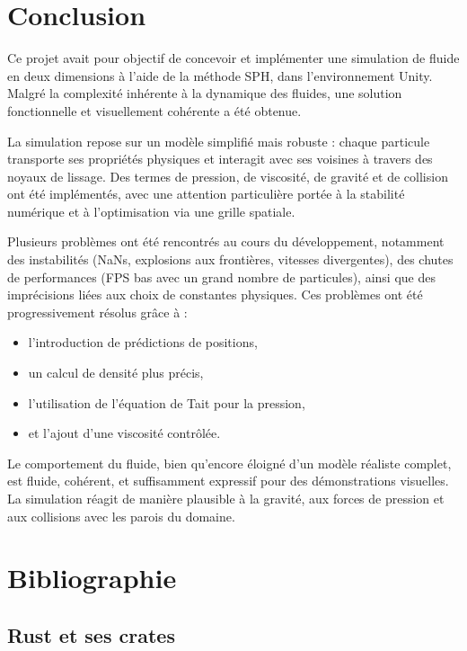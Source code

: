\documentclass{article}
\begin{document}
\section{Conclusion}

Ce projet avait pour objectif de concevoir et implémenter une simulation de fluide en deux dimensions à l’aide de la méthode SPH, dans l’environnement Unity. Malgré la complexité inhérente à la dynamique des fluides, une solution fonctionnelle et visuellement cohérente a été obtenue.

La simulation repose sur un modèle simplifié mais robuste : chaque particule transporte ses propriétés physiques et interagit avec ses voisines à travers des noyaux de lissage. Des termes de pression, de viscosité, de gravité et de collision ont été implémentés, avec une attention particulière portée à la stabilité numérique et à l’optimisation via une grille spatiale.

Plusieurs problèmes ont été rencontrés au cours du développement, notamment des instabilités (NaNs, explosions aux frontières, vitesses divergentes), des chutes de performances (FPS bas avec un grand nombre de particules), ainsi que des imprécisions liées aux choix de constantes physiques. Ces problèmes ont été progressivement résolus grâce à :

\begin{itemize}
\item l’introduction de prédictions de positions,
\item un calcul de densité plus précis,
\item l’utilisation de l’équation de Tait pour la pression,
\item et l’ajout d’une viscosité contrôlée.
\end{itemize}

Le comportement du fluide, bien qu’encore éloigné d’un modèle réaliste complet, est fluide, cohérent, et suffisamment expressif pour des démonstrations visuelles. La simulation réagit de manière plausible à la gravité, aux forces de pression et aux collisions avec les parois du domaine.

\section{Bibliographie}

\subsection{Rust et ses crates}
\end{document}
